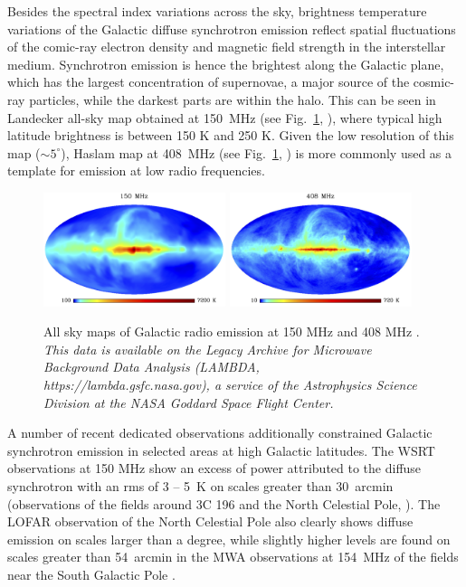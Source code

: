 Besides the spectral index variations across the sky, brightness temperature variations of the Galactic diffuse synchrotron emission reflect spatial fluctuations of the comic-ray electron density and magnetic field strength in the interstellar medium. Synchrotron emission is hence the brightest along the Galactic plane, which has the largest concentration of supernovae, a major source of the cosmic-ray particles, while the darkest parts are within the halo. This can be seen in Landecker all-sky map obtained at 150~MHz (see Fig.~\ref{fig:GDSE}, \cite{landecker70}), where typical high latitude brightness is between 150 K and 250 K. Given the low resolution of this map ($\sim5^\circ$), Haslam map at 408~MHz (see Fig.~\ref{fig:GDSE}, \cite{haslam82, haslam81, remazeilles15}) is more commonly used as a template for emission at low radio frequencies. 

\begin{figure}[!t]
\centering
    \includegraphics[width=0.475\textwidth]{Chapman_Jelic/Images/landecker.png}
    \includegraphics[width=0.475\textwidth]{Chapman_Jelic/Images/haslam.png}
    \caption{All sky maps of Galactic radio emission at 150 MHz \cite{landecker70} and 408 MHz \cite{haslam82, haslam81, remazeilles15}. \textit{This data is available on the Legacy Archive for Microwave Background Data Analysis (LAMBDA, https://lambda.gsfc.nasa.gov), a service of the Astrophysics Science Division at the NASA Goddard Space Flight Center.}}
    \label{fig:GDSE} 
\end{figure}

A number of recent dedicated observations additionally constrained Galactic synchrotron emission in selected areas at high Galactic latitudes. The WSRT observations at 150 MHz show an excess of power attributed to the diffuse synchrotron with an rms of 3 -- 5~K on scales greater than 30~arcmin (observations of the fields around 3C 196 and the North Celestial Pole,  \cite{bernardi10}). The LOFAR observation of the North Celestial Pole \cite{patil17} also clearly shows diffuse emission on scales larger than a degree, while slightly higher levels are found on scales greater than 54~arcmin in the MWA observations at 154~MHz of the fields near the South Galactic Pole \cite{lenc16}.

